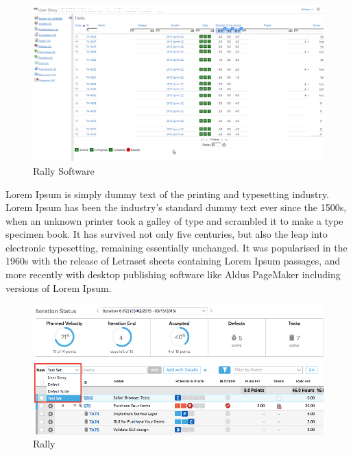 \documentclass[12pt,a4paper]{report}
\begin{document}
\begin{figure}[H]
\includegraphics[scale=.5]{Rally2.png}
  \caption{Rally Software}
  \label{fig:Rally2}
\end{figure}

Lorem Ipsum is simply dummy text of the printing and typesetting industry. Lorem Ipsum has been the industry's standard dummy text ever since the 1500s, when an unknown printer took a galley of type and scrambled it to make a type specimen book. It has survived not only five centuries, but also the leap into electronic typesetting, remaining essentially unchanged. It was popularised in the 1960s with the release of Letraset sheets containing Lorem Ipsum passages, and more recently with desktop publishing software like Aldus PageMaker including versions of Lorem Ipsum.
\begin{figure}[H]
\includegraphics[scale=.5]{Rally1.png}
  \caption{Rally}
  \label{fig:Rally1}
\end{figure}
\end{document}
